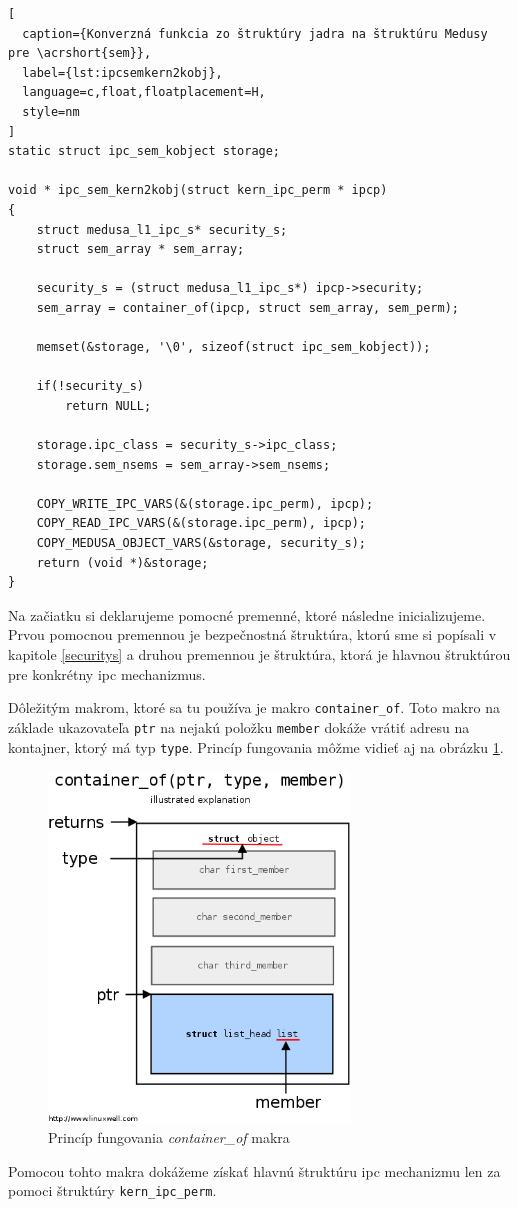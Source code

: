 \begin{lstlisting}[
  caption={Konverzná funkcia zo štruktúry jadra na štruktúru Medusy pre \acrshort{sem}},
  label={lst:ipcsemkern2kobj},
  language=c,float,floatplacement=H,
  style=nm
]
static struct ipc_sem_kobject storage;

void * ipc_sem_kern2kobj(struct kern_ipc_perm * ipcp)
{
	struct medusa_l1_ipc_s* security_s;
	struct sem_array * sem_array;

	security_s = (struct medusa_l1_ipc_s*) ipcp->security;
	sem_array = container_of(ipcp, struct sem_array, sem_perm);
	
	memset(&storage, '\0', sizeof(struct ipc_sem_kobject));
	
	if(!security_s)
		return NULL;
	
	storage.ipc_class = security_s->ipc_class;
	storage.sem_nsems = sem_array->sem_nsems;
	
	COPY_WRITE_IPC_VARS(&(storage.ipc_perm), ipcp);
	COPY_READ_IPC_VARS(&(storage.ipc_perm), ipcp);
	COPY_MEDUSA_OBJECT_VARS(&storage, security_s);
	return (void *)&storage;
}
\end{lstlisting}

Na začiatku si deklarujeme pomocné premenné, ktoré následne inicializujeme. Prvou pomocnou premennou je bezpečnostná štruktúra, ktorú sme si popísali v kapitole \ref{securitys} a druhou premennou je štruktúra, ktorá je hlavnou štruktúrou pre konkrétny \acrshort{ipc} mechanizmus. 

Dôležitým makrom, ktoré sa tu používa je makro \texttt{container\_of}. Toto makro na základe ukazovateľa \texttt{ptr} na nejakú položku \texttt{member} dokáže vrátiť adresu na kontajner, ktorý má typ \texttt{type}. Princíp fungovania môžme vidieť aj na obrázku \ref{containerof}.
\begin{figure}[!h]
  \centering
  \includegraphics[width=8cm]{img/container_of.png}
  \caption{Princíp fungovania \textit{container\_of} makra \cite{containerof}}
  \label{containerof}
\end{figure}
Pomocou tohto makra dokážeme získať hlavnú štruktúru \acrshort{ipc} mechanizmu len za pomoci štruktúry \texttt{kern\_ipc\_perm}. 

